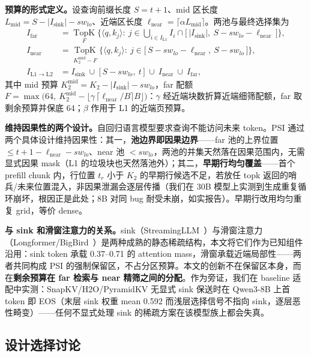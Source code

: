 \documentclass[11pt]{article}
\begin{document}
\textbf{预算的形式定义。}设查询前缀长度 $S=t+1$、mid 区长度 $L_{\mathrm{mid}}=S-|I_{\mathrm{sink}}|-sw_{lo}$、近端区长度 $\ell_{\mathrm{near}}=\lceil\alpha L_{\mathrm{mid}}\rceil$。两池与最终选择集为
\begin{align}
I_{\mathrm{far}} &= \operatorname*{TopK}_{F}\Big\{\langle q,k_j\rangle:\ j\in\bigcup\nolimits_{i\in I_{\mathrm{L1}}} I_i\cap\big[\,|I_{\mathrm{sink}}|,\ S-sw_{lo}-\ell_{\mathrm{near}}\,\big]\Big\},\\
I_{\mathrm{near}} &= \operatorname*{TopK}_{K_2^{\mathrm{mid}}-F}\Big\{\langle q,k_j\rangle:\ j\in\big[\,S-sw_{lo}-\ell_{\mathrm{near}},\ S-sw_{lo}\,\big]\Big\},\\
I_{\mathrm{L1}\rightarrow\mathrm{L2}} &= I_{\mathrm{sink}}\ \cup\ \big[\,S-sw_{lo},\ t\,\big]\ \cup\ I_{\mathrm{near}}\ \cup\ I_{\mathrm{far}},
\end{align}
其中 mid 预算 $K_2^{\mathrm{mid}}=K_2-|I_{\mathrm{sink}}|-sw_{lo}$，far 配额 $F=\max\big(64,\ K_2^{\mathrm{mid}}-\lfloor\gamma\,\lceil\ell_{\mathrm{near}}/B\rceil B\rfloor\big)$：$\gamma$ 经近端块数折算近端细筛配额，far 取剩余预算并保底 64；$\beta$ 作用于 L1 的近端页预算。

\textbf{维持因果性的两个设计。}自回归语言模型要求查询不能访问未来 token。PSI 通过两个具体设计维持因果性：其一，\textbf{池边界即因果边界}——far 池的上界位置 $\leq t+1-\ell_{\mathrm{near}}-sw_{lo}$、near 池 $< sw_{lo}$，两池的并集天然落在因果范围内，无需显式因果 mask（L1 的垃圾块也天然落池外）；其二，\textbf{早期行均匀覆盖}——首个 prefill chunk 内，行位置 $t_r$ 小于 $K_2$ 的早期行候选不足，若放任 topk 返回的哨兵/未来位置混入，非因果泄漏会逐层传播（我们在 30B 模型上实测到生成重复循环崩坏，根因正是此处；8B 对同 bug 耐受未崩，如实报告）。早期行改用均匀重复 grid，等价 dense。

\textbf{与 sink 和滑窗注意力的关系。}sink（StreamingLLM~\cite{streamingllm}）与滑窗注意力（Longformer/BigBird~\cite{longformer,bigbird}）是两种成熟的静态稀疏结构，本文将它们作为已知组件沿用：sink token 承载 0.37--0.71 的 attention mass，滑窗承载近端局部性——两者共同构成 PSI 的强制保留区，不占分区预算。本文的创新不在保留区本身，而在\textbf{剩余预算在 far 检索与 near 精筛之间的分配}。作为旁证，我们在 baseline 适配中实测：SnapKV/H2O/PyramidKV 无显式 sink 保送时在 Qwen3-8B 上首 token 即 EOS（末层 sink 权重 mean 0.592 而浅层选择信号不指向 sink，逐层恶性畸变）——任何不显式处理 sink 的稀疏方案在该模型族上都会失真。

\subsection{设计选择讨论}
\end{document}
